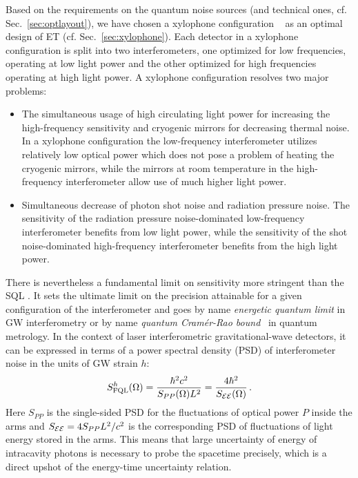 Based on the requirements on the quantum noise sources (and technical ones, cf. Sec.~\ref{sec:optlayout}), we have chosen a xylophone configuration ~\cite{Hild2010a} as an optimal design of ET (cf. Sec.~\ref{sec:xylophone}). Each detector in a xylophone configuration is split into two interferometers, one optimized for low frequencies, operating at low light power and the other optimized for high frequencies operating at high light power. A xylophone configuration resolves two major problems:
\begin{itemize}
\item The simultaneous usage of high circulating light power for increasing the high-frequency sensitivity and cryogenic mirrors for decreasing thermal noise. In a xylophone configuration the low-frequency interferometer utilizes relatively low optical power which does not pose a problem of heating the cryogenic mirrors, while the mirrors at room temperature in the high-frequency interferometer allow use of much higher light power.
\item Simultaneous decrease of photon shot noise and radiation pressure noise. The sensitivity of the radiation pressure noise-dominated low-frequency interferometer benefits from low light power, while the sensitivity of the shot noise-dominated high-frequency interferometer benefits from the high light power.
\end{itemize}



There is nevertheless a fundamental limit on sensitivity more stringent than the SQL \cite{Miao2017b,Miao2017,2019_LivRevRel_Danilishin}. It sets the ultimate limit on the precision attainable for a given configuration of the interferometer and goes by name \textit{energetic quantum limit} \cite{00p1BrGoKhTh} in GW interferometry or by name \textit{quantum Cram\'er-Rao bound}~\cite{Tsang2011} in quantum metrology. In the context of laser interferometric gravitational-wave detectors, it can be expressed in terms of a power spectral density (PSD) of interferometer noise in the units of GW strain $h$:
\begin{equation}\label{eq:FQL_new}
S^h_{\rm FQL}(\Omega)=\frac{\hbar^2c^2}{S_{PP}(\Omega)L^2} = 
\frac{4\hbar^2}{S_{\cal E E}(\Omega)}\,. 
\end{equation}
Here $S_{PP}$ is the single-sided PSD for the fluctuations of optical power $P$ inside the arms and $S_{\cal EE} = 4 S_{PP} L^2/c^2$ is the corresponding PSD of fluctuations of light energy stored in the arms. This means that large uncertainty of energy of intracavity photons is necessary to probe the spacetime precisely, which is a direct upshot of the energy-time uncertainty relation. 

